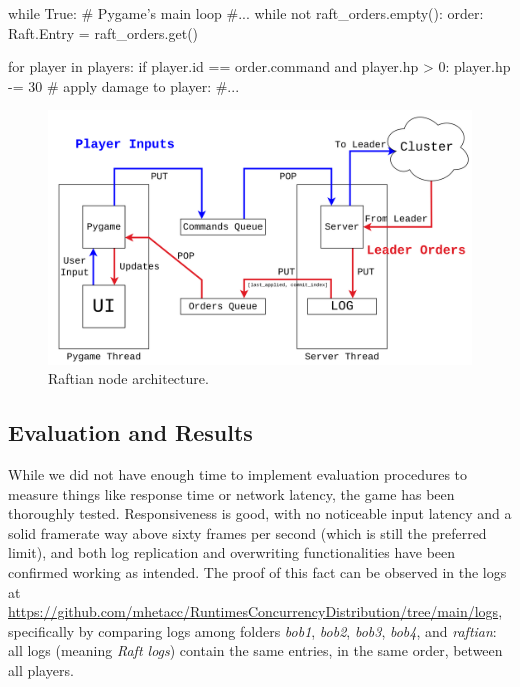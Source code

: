 \begin{python}[label={code:updateUI}, caption={Pygame periodically checks whether there are new orders and updates the UI accordingly}]
while True: # Pygame's main loop
    #...
    while not raft_orders.empty():
        order: Raft.Entry = raft_orders.get()

        for player in players:
            if player.id == order.command and player.hp > 0:
                player.hp -= 30  # apply damage to player:
                #...
\end{python}

\begin{figure}[h]
  \centering
  \includegraphics[width=\linewidth]{images/nodeArchitecture.png}
  
  \caption{Raftian node architecture.}
  \label{fig:raftianArch}
\end{figure}

\subsection{Evaluation and Results}

While we did not have enough time to implement evaluation procedures to measure things like response time or network latency, the game has been thoroughly tested. Responsiveness is good, with no noticeable input latency and a solid framerate way above sixty frames per second (which is still the preferred limit), and both log replication and overwriting functionalities have been confirmed working as intended. The proof of this fact can be observed in the logs at \url{https://github.com/mhetacc/RuntimesConcurrencyDistribution/tree/main/logs}, specifically by comparing logs among folders \textit{bob1}, \textit{bob2}, \textit{bob3}, \textit{bob4}, and \textit{raftian}: all logs (meaning \textit{Raft logs}) contain the same entries, in the same order, between all players.
